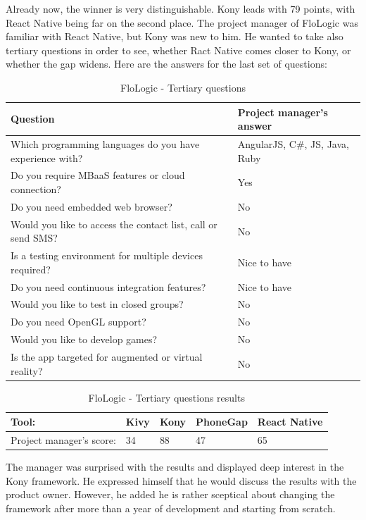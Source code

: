 \documentclass[english,master,public,dept460,male,cpdeclaration,oneside]{diploma}
\begin{document}
Already now, the winner is very distinguishable. Kony leads with 79 points, with React Native being far on the second place. The project manager of FloLogic was familiar with React Native, but Kony was new to him. He wanted to take also tertiary questions in order to see, whether Ract Native comes closer to Kony, or whether the gap widens. Here are the answers for the last set of questions:

\begin{table}[!h]
	\centering
	\caption{FloLogic - Tertiary questions}
	\begin{tabular}{p{9.5cm} | p{3cm}}
		\toprule		
		\textbf{Question} &	\textbf{Project manager’s answer} \\
		\midrule		
		Which programming languages do you have experience with? & AngularJS, C\#, JS, Java, Ruby \\
		Do you require MBaaS features or cloud connection? & Yes \\
		Do you need embedded web browser? & No \\
		Would you like to access the contact list, call or send SMS? & No \\
		Is a testing environment for multiple devices required? & Nice to have \\
		Do you need continuous integration features? & Nice to have \\
		Would you like to test in closed groups? & No \\
		Do you need OpenGL support? & No \\
		Would you like to develop games? & No \\
		Is the app targeted for augmented or virtual reality? & No \\			
		\midrule
	\end{tabular}
\end{table}

\begin{table}[!h]
\centering
\caption{FloLogic - Tertiary questions results}
\begin{tabular}{p{4cm} | p{2cm} | p{2cm} | p{2cm} | p{2cm}}
	\toprule		
	\textbf{Tool:} & \textbf{Kivy} & \textbf{Kony} & \textbf{PhoneGap} & \textbf{React Native} \\
	\midrule		
	Project manager’s score: & 34 & 88 & 47 & 65 \\	
	\midrule
\end{tabular}
\end{table}

The manager was surprised with the results and displayed deep interest in the Kony framework. He expressed himself that he would discuss the results with the product owner. However, he added he is rather sceptical about changing the framework after more than a year of development and starting from scratch.
\end{document}
